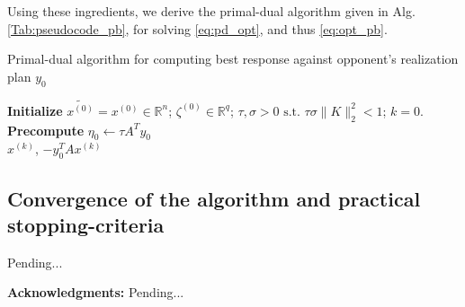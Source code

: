 \documentclass[a4paper,10pt,journal]{IEEEtran}
\begin{document}
Using these ingredients, we derive the primal-dual algorithm given in Alg.\ref{Tab:pseudocode_pb}, 
for solving \eqref{eq:pd_opt}, and thus \eqref{eq:opt_pb}.

\begin{algorithm}[htb]
\caption{Primal-dual algorithm for computing best response against opponent's realization plan $y_0$}
\textbf{Initialize} $\tilde{x^{(0)}} = x^{(0)} \in \mathbb{R}^n$; $\zeta^{(0)} \in \mathbb{R}^{q}$;
$\tau, \sigma > 0 \text{ s.t. }\tau\sigma \|K\|_2^2 < 1$; $k = 0$.\\
\textbf{Precompute} $\eta_0 \leftarrow \tau A^Ty_0$\\
 \Return $x^{(k)}$, $-y_0^TAx^{(k)}$
\label{Tab:pseudocode_pb}
\end{algorithm}

\subsection{Convergence of the algorithm and practical stopping-criteria}
Pending...

\medskip \noindent
\textbf{Acknowledgments:}
Pending...

 
\end{document}
